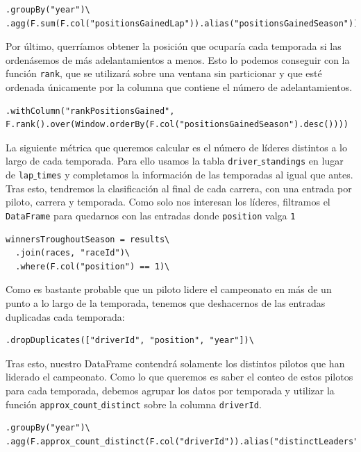 \documentclass[12pt,twoside,titlepage]{report}
\begin{document}
\begin{lstlisting}
.groupBy("year")\
.agg(F.sum(F.col("positionsGainedLap")).alias("positionsGainedSeason"))\
\end{lstlisting}

Por último, querríamos obtener la posición que ocuparía cada temporada si las ordenásemos de más adelantamientos a menos. Esto lo podemos conseguir con la función \texttt{rank}, que se utilizará sobre una ventana sin particionar y que esté ordenada únicamente por la columna que contiene el número de adelantamientos.

\begin{lstlisting}
.withColumn("rankPositionsGained", F.rank().over(Window.orderBy(F.col("positionsGainedSeason").desc())))
\end{lstlisting}

La siguiente métrica que queremos calcular es el número de líderes distintos a lo largo de cada temporada. Para ello usamos la tabla \texttt{driver$\_$standings} en lugar de \texttt{lap$\_$times} y completamos la información de las temporadas al igual que antes. Tras esto, tendremos la clasificación al final de cada carrera, con una entrada por piloto, carrera y temporada. Como solo nos interesan los líderes, filtramos el \texttt{DataFrame} para quedarnos con las entradas donde \texttt{position} valga \texttt{1}

\begin{lstlisting}
winnersTroughoutSeason = results\
  .join(races, "raceId")\
  .where(F.col("position") == 1)\
\end{lstlisting}

Como es bastante probable que un piloto lidere el campeonato en más de un punto a lo largo de la temporada, tenemos que deshacernos de las entradas duplicadas cada temporada:

\begin{lstlisting}
.dropDuplicates(["driverId", "position", "year"])\
\end{lstlisting}

Tras esto, nuestro DataFrame contendrá solamente los distintos pilotos que han liderado el campeonato. Como lo que queremos es saber el conteo de estos pilotos para cada temporada, debemos agrupar los datos por temporada y utilizar la función \texttt{approx$\_$count$\_$distinct} sobre la columna \texttt{driverId}.

\begin{lstlisting}
.groupBy("year")\
.agg(F.approx_count_distinct(F.col("driverId")).alias("distinctLeaders"))\  
\end{lstlisting}
\end{document}
